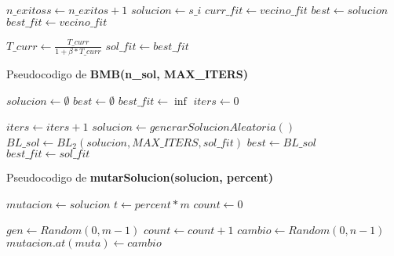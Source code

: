 \begin{algorithm}[H]
\begin{algorithmic}[1]
                \State $n\_exitoss \gets n\_exitos + 1 $
                \State $ solucion \gets s\_i$
                \State $curr\_fit \gets vecino\_fit$
                \State $best \gets solucion $
                \State $best\_fit \gets vecino\_fit $
                \EndIf  
              \EndIf
            \EndWhile

            \State $T\_curr \gets \frac{T\_curr}{1 + \beta * T\_curr} $
          \EndWhile
          \State $ sol\_fit \gets best\_fit$          
          \State {}
         \EndFunction
       \end{algorithmic}
     \end{algorithm}

     Pseudocodigo de \textbf{BMB(n_sol, MAX\_ITERS)}
     \begin{algorithm}[H]
       \begin{algorithmic}[1]
          \State $solucion \gets \emptyset$
          \State $best \gets \emptyset$
          \State $best\_fit \gets \inf$
          \State $iters \gets 0$

            \State $iters \gets iters + 1$
            \State $solucion \gets generarSolucionAleatoria()$
            \State $BL\_sol \gets BL_2(solucion, MAX\_ITERS, sol\_fit)$
              \State $best \gets BL\_sol$
              \State $best\_fit \gets sol\_fit$
            \EndIf
          \EndWhile
          \State {}
         \EndFunction
       \end{algorithmic}
     \end{algorithm}

     Pseudocodigo de \textbf{mutarSolucion(solucion, percent)}
     \begin{algorithm}[H]
       \begin{algorithmic}[1]
          \State $mutacion \gets solucion$
          \State $t \gets percent*m$
          \State $count \gets 0$

            \State $gen \gets Random(0,m-1)$
            \State $count \gets count + 1$
            \State $cambio \gets Random(0,n-1)$ 
            \State $mutacion.at(muta) \gets cambio$
          \EndWhile
          \State {}
         \EndFunction
       \end{algorithmic}
     \end{algorithm}

